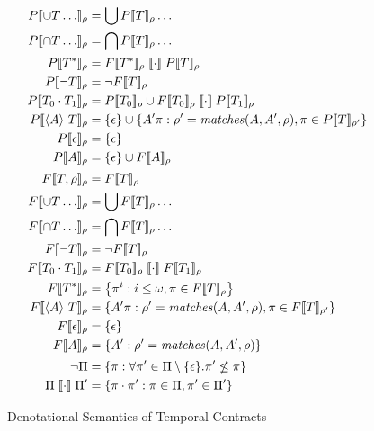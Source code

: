 \FloatBarrier
\begin{figure}
 \begin{align*}
   \denotetcone{\stOr{\mtcon \ldots}}{\menv} &= \bigcup\denotetcone{\mtcon}{\menv}\ldots
\\
    \denotetcone{\stAnd{\mtcon \ldots}}{\menv} &= \bigcap\denotetcone{\mtcon}{\menv}\ldots
\\
    \denotetcone{\stmany{\mtcon}}{\menv} &= \denotetconfulle{\stmany{\mtcon}}{\menv} \semseq \denotetcone{\mtcon}{\menv}
\\
    \denotetcone{\stnot{\mtcon}}{\menv} &= \semneg{\denotetconfulle{\mtcon}{\menv}}
\\
    \denotetcone{\stseq{\mtcon_0}{\mtcon_1}}{\menv} &= \denotetcone{\mtcon_0}{\menv} \cup \denotetconfulle{\mtcon_0}{\menv}\semseq \denotetcone{\mtcon_1}{\menv}
\\
    \denotetcone{\stbind{\mevent}{\mtcon}}{\menv} &= \setof{\epsilon} \cup \setbuild{\mevent' \mtrace}{\menv' = \matches(\mevent, \mevent', \menv), \mtrace \in \denotetcone{\mtcon}{\menv'}}
\\
    \denotetcone{\epsilon}{\menv} &= \setof{\epsilon}
\\
    \denotetcone{\mevent}{\menv} &= \setof{\epsilon} \cup \denotetconfulle{\mevent}{\menv}
\\[2pt]
    \denotetconfulle{\mtcon,\menv}{\menv} &= \denotetconfulle{\mtcon}{\menv}
\\
    \denotetconfulle{\stOr{\mtcon \ldots}}{\menv} &= \bigcup\denotetconfulle{\mtcon}{\menv}\ldots
\\
    \denotetconfulle{\stAnd{\mtcon \ldots}}{\menv} &= \bigcap\denotetconfulle{\mtcon}{\menv}\ldots
\\
    \denotetconfulle{\stnot{\mtcon}}{\menv} &= \semneg{\denotetconfulle{\mtcon}{\menv}}
\\
    \denotetconfulle{\stseq{\mtcon_0}{\mtcon_1}}{\menv} &= \denotetconfulle{\mtcon_0}{\menv} \semseq \denotetconfulle{\mtcon_1}{\menv}
\\
    \denotetconfulle{\stmany{\mtcon}}{\menv} &= \setbuild{\mtrace^i}{i \le \omega, \mtrace \in \denotetconfulle{\mtcon}{\menv}}
\\
    \denotetconfulle{\stbind{\mevent}{\mtcon}}{\menv} &= \setbuild{\mevent' \mtrace}{\menv' = \matches(\mevent, \mevent', \menv), \mtrace \in \denotetconfulle{\mtcon}{\menv'}}
\\
    \denotetconfulle{\epsilon}{\menv} &= \setof{\epsilon}
\\
    \denotetconfulle{\mevent}{\menv} &= \setbuild{\mevent'}{\menv' = \matches(\mevent, \mevent', \menv)}
\\[2pt]
    \semneg{\Pi} &= \setbuild{\mtrace}{\forall \mtrace' \in \Pi\setminus\setof{\epsilon}. \mtrace' \nleq \mtrace}
\\
    \Pi \semseq \Pi' &= \setbuild{\mtrace \cdot \mtrace'}{\mtrace \in \Pi, \mtrace' \in \Pi'}
 \end{align*}
  \caption{Denotational Semantics of Temporal Contracts}
  \label{fig:tcontract-denotation}
\end{figure}

